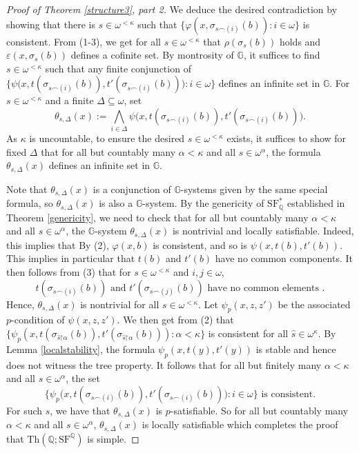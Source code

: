 \documentclass[letterpaper]{amsart}
\newcommand{\res}{\mathord{\upharpoonright}} %
\newcommand{\qq}{\mathbb{Q}}
\renewcommand{\gg}{\mathbb{G}}
\newcommand{\SQ}{\mathrm{SF}^\qq}
\newcommand{\TSFQ}{\mathrm{SF}^*_{\qq}}
\begin{document}
\begin{proof}[Proof of Theorem \ref{structure3}, part 2]
We deduce the desired contradiction by showing that there is $ s \in \omega^{<\kappa}$ such that   $\{   \varphi(x, \sigma_{s\frown (i)}(b)) : i \in \omega\}$ is consistent. 
From  (1-3), we get for all $s \in \omega^{< \kappa}$ that  $\rho(\sigma_{s}(b) )$ holds  and $\varepsilon(x, \sigma_{s}(b))$ defines a cofinite set. By montrosity of $\gg$, it suffices to find $s \in  \omega^{<\kappa}$ such that  
  any finite conjunction of  $\{ \psi\big(x, t(\sigma_{s\frown (i)}(b)),t'(\sigma_{s\frown (i)}(b))\big) : i \in \omega\}$ defines an infinite set in $\gg$. For $s \in \omega^{<\kappa}$ and a finite $\Delta \subseteq \omega$, set 
  $$ \theta_{s, \Delta}(x) := \bigwedge_{i \in \Delta}  \psi\big(x, t(\sigma_{s\frown (i)}(b)),t'(\sigma_{s\frown (i)}(b))\big).  $$
 As $\kappa$ is uncountable, to ensure the desired $s\in \omega^{<\kappa}$ exists, it suffices to show for fixed $\Delta$  that for all but countably many $\alpha < \kappa$ and all $s \in \omega^\alpha$, the formula $\theta_{s, \Delta}(x)$ defines an infinite set in $\gg$. 
 
 Note that   $\theta_{s, \Delta}(x)$ is a conjunction of $\gg$-systems given by the same special formula, so $\theta_{s, \Delta}(x)$ is also a $\gg$-system.  By the genericity of $\TSFQ$ established in Theorem \ref{genericity}, we need to check that for all but countably many $\alpha < \kappa$ and  all $s \in \omega^\alpha$, the $\gg$-system  $\theta_{s, \Delta}(x)$ is nontrivial and locally satisfiable. Indeed, this implies that 
 By (2), $\varphi(x, b)$ is consistent, and so is  $\psi(x, t(b),t'(b))$. This implies in particular that $t(b)$ and $t'(b)$ have no common components.  It then follows from (3) that for $s \in \omega^{< \kappa}$ and $i, j \in \omega$, 
  $$t(\sigma_{s\frown (i)}(b)) \text{ and } t'(\sigma_{s\frown (j)} (b)) \text{  have no common elements }.$$ 
  Hence, $\theta_{s, \Delta}(x)$ is nontrivial for all $s \in \omega^{< \kappa}$. Let $\psi_p(x,z,z')$ be the associated $p$-condition of $\psi(x,z,z')$. We then get from (2) that $\{ \psi_p(x, t(\sigma_{\hat{s} \res \alpha}(b)), t'(\sigma_{\hat{s} \res \alpha}(b))): \alpha <\kappa\}$ is consistent  for all $\hat{s} \in \omega^\kappa$. By Lemma \ref{localstability}, the formula $\psi_p(x, t(y),t'(y)  )$ is stable and hence does not witness the tree property.  It follows that for all but finitely many $\alpha< \kappa$ and all $s \in \omega^\alpha$, the set 
  $$\{ \psi_p\big(x, t(\sigma_{s\frown (i)} (b)), t'(\sigma_{s\frown (i)} (b))\big) : i \in \omega\} \text{ is consistent}.$$ For such $s$, we have that $\theta_{s, \Delta}(x)$ is $p$-satisfiable. So for all but countably many $\alpha< \kappa$ and all $s \in \omega^\alpha$, $\theta_{s, \Delta}(x)$  is locally satisfiable which completes the proof that $\text{Th}(\qq; \SQ)$  is simple.
 

\end{proof}
\end{document}
